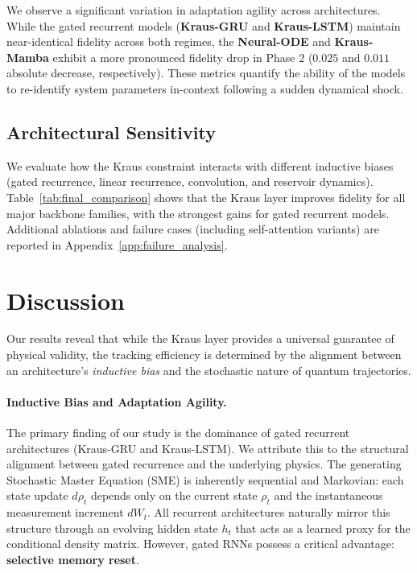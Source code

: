 \documentclass{article} %
\begin{document}
We observe a significant variation in adaptation agility across architectures. While the gated recurrent models (\textbf{Kraus-GRU} and \textbf{Kraus-LSTM}) maintain near-identical fidelity across both regimes, the \textbf{Neural-ODE} and \textbf{Kraus-Mamba} exhibit a more pronounced fidelity drop in Phase 2 ($0.025$ and $0.011$ absolute decrease, respectively). These metrics quantify the ability of the models to re-identify system parameters in-context following a sudden dynamical shock.


\subsection{Architectural Sensitivity}
We evaluate how the Kraus constraint interacts with different inductive biases (gated recurrence, linear recurrence, convolution, and reservoir dynamics).
Table~\ref{tab:final_comparison} shows that the Kraus layer improves fidelity for all major backbone families, with the strongest gains for gated recurrent models.
Additional ablations and failure cases (including self-attention variants) are reported in Appendix~\ref{app:failure_analysis}.

\section{Discussion}

Our results reveal that while the Kraus layer provides a universal guarantee of physical validity, the tracking efficiency is determined by the alignment between an architecture’s \emph{inductive bias} and the stochastic nature of quantum trajectories.

\paragraph{Inductive Bias and Adaptation Agility.} The primary finding of our study is the dominance of gated recurrent architectures (Kraus-GRU and Kraus-LSTM). We attribute this to the structural alignment between gated recurrence and the underlying physics. The generating Stochastic Master Equation (SME) is inherently sequential and Markovian: each state update $d\rho_t$ depends only on the current state $\rho_t$ and the instantaneous measurement increment $dW_t$. All recurrent architectures naturally mirror this structure through an evolving hidden state $h_t$ that acts as a learned proxy for the conditional density matrix. However, gated RNNs possess a critical advantage: \textbf{selective memory reset}.
\end{document}
